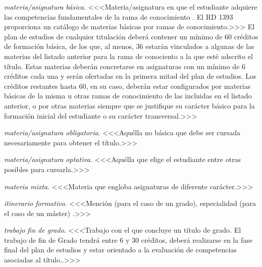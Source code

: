     \item \emph{materia/asignatura básica}. <<<Materia/asignatura en que el estudiante adquiere las competencias fundamentales de la rama de conocimiento \cite[artículo 12, apartado 2]{rd1393}. El RD 1393 \cite[anexo II]{rd1393} proporciona un catálogo de materias básicas por ramas de conocimiento.>>> El plan de estudios de cualquier titulación deberá contener un mínimo de 60 créditos de formación básica, de los que, al menos, 36 estarán vinculados a algunas de las materias del listado anterior para la rama de conociento a la que esté adscrito el título\cite[artículo 12, apartado 5]{rd1393}.  Estas materias deberán concretarse en asignaturas con un mínimo de 6 créditos cada una y serán ofertadas en la primera mitad del plan de estudios.  Los créditos restantes hasta 60, en su caso, deberán estar configurados por materias básicas de la misma u otras ramas de conocimiento de las incluidas en el listado anterior, o por otras materias siempre que se justifique su carácter básico para la formación inicial del estudiante o su carácter transversal.>>>

    \item \emph{materia/asignatura obligatoria}. <<<Aquélla no básica que debe ser cursada necesariamente para obtener el título\cite[sección D.5]{guiaMadridMasD}\cite[artículo 12, apartado 2]{rd1393}.>>>

    \item \emph{materia/asignatura optativa}. <<<Aquélla que elige el estudiante entre otras posibles para cursarla\cite[sección D.5]{guiaMadridMasD}\cite[artículo 12, apartado 2]{rd1393}.>>>

    \item \emph{materia mixta}. <<<Materia que engloba asignaturas de diferente carácter\cite[sección D.5]{guiaMadridMasD}\cite[artículo 12, apartado 2]{rd1393}.>>>

    \item \emph{itinerario formativo}. <<<Mención (para el caso de un grado), especialidad (para el caso de un máster) \cite[sección D.4]{guiaMadridMasD}\cite[artículo 9, apartado 3]{rd1393}.>>>
 
    \item \emph{trabajo fin de grado}. <<<Trabajo con el que concluye un título de grado\cite[artículo 12, apartado 3]{rd1393}. El trabajo de fin de Grado tendrá entre 6 y 30 créditos, deberá realizarse en la fase final del plan de estudios y estar orientado a la evaluación de competencias asociadas al título.\cite[artículo 12, apartado 7]{rd1393}.>>>

